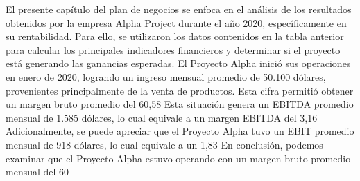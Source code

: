  El presente capítulo del plan de negocios se enfoca en el análisis de los resultados obtenidos por la empresa Alpha Project durante el año 2020, específicamente en su rentabilidad. Para ello, se utilizaron los datos contenidos en la tabla anterior para calcular los principales indicadores financieros y determinar si el proyecto está generando las ganancias esperadas.
El Proyecto Alpha inició sus operaciones en enero de 2020, logrando un ingreso mensual promedio de 50.100 dólares, provenientes principalmente de la venta de productos. Esta cifra permitió obtener un margen bruto promedio del 60,58%
Esta situación genera un EBITDA promedio mensual de 1.585 dólares, lo cual equivale a un margen EBITDA del 3,16%
Adicionalmente, se puede apreciar que el Proyecto Alpha tuvo un EBIT promedio mensual de 918 dólares, lo cual equivale a un 1,83%
En conclusión, podemos examinar que el Proyecto Alpha estuvo operando con un margen bruto promedio mensual del 60%
